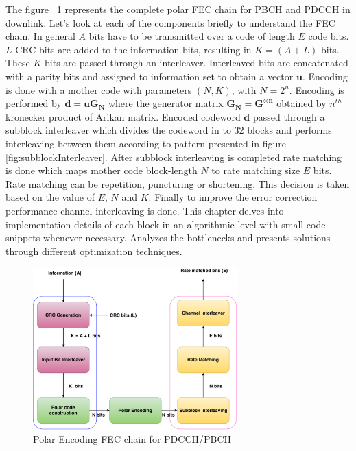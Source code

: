 The figure ~\ref{fig:5g_txfec_chain} represents the complete polar FEC chain for PBCH and PDCCH in downlink. Let's look at each of the components briefly to understand the FEC chain. In general $A$ bits have to be transmitted over a code of length $E$ code bits. $L$ CRC bits are added to the information bits, resulting in  $K = (A + L)$ bits. These $K$ bits are passed through an interleaver. Interleaved bits are concatenated with a parity bits and assigned to information set to obtain a vector $\boldsymbol{u}$. Encoding is done with a mother code with parameters $(N,K)$, with $N = 2^{n}$. Encoding is performed by $\boldsymbol{d = uG_{N}}$ where the generator matrix $\boldsymbol{G_{N} = G^{\otimes n}}$ obtained by $n^{th}$ kronecker product of Arikan matrix. Encoded codeword $\boldsymbol{d}$ passed through a subblock interleaver which divides the codeword in to 32 blocks and performs interleaving between them according to pattern presented in figure \ref{fig:subblockInterleaver}. After subblock interleaving is completed rate matching is done which maps mother code block-length $N$ to rate matching size $E$ bits. Rate matching can be repetition, puncturing or shortening. This decision is taken based on the value of $E$, $N$ and $K$. Finally to improve the error correction performance channel interleaving is done. This chapter delves into implementation details of each block in an algorithmic level with small code snippets whenever necessary. Analyzes the bottlenecks and presents solutions through different optimization techniques.


\begin{figure}[h]
	\centering
	\includegraphics[width=0.7\textwidth]{./figures/5GFECChain.pdf}
	\caption{Polar Encoding FEC chain for PDCCH/PBCH}
	\label{fig:5g_txfec_chain}
\end{figure}

